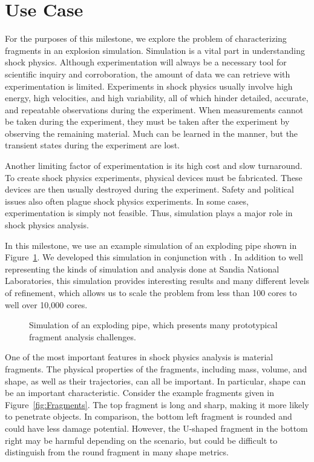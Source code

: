 \section{Use Case}
\label{sec:UseCase}


For the purposes of this milestone, we explore the problem of
characterizing fragments in an explosion simulation.  Simulation is a vital
part in understanding shock physics.  Although experimentation will always
be a necessary tool for scientific inquiry and corroboration, the amount of
data we can retrieve with experimentation is limited.  Experiments in shock
physics usually involve high energy, high velocities, and high variability,
all of which hinder detailed, accurate, and repeatable observations during
the experiment.  When measurements cannot be taken during the experiment,
they must be taken after the experiment by observing the remaining
material.  Much can be learned in the manner, but the transient states
during the experiment are lost.

Another limiting factor of experimentation is its high cost and slow
turnaround.  To create shock physics experiments, physical devices must be
fabricated.  These devices are then usually destroyed during the
experiment.  Safety and political issues also often plague shock physics
experiments.  In some cases, experimentation is simply not feasible.  Thus,
simulation plays a major role in shock physics analysis.

In this milestone, we use an example simulation of an exploding pipe shown
in Figure~\ref{fig:ExplodingPipe}.  We developed this simulation in
conjunction with .   In addition to well representing
the kinds of simulation and analysis done at Sandia National Laboratories,
this simulation provides interesting results and many different levels of
refinement, which allows us to scale the problem from less than 100 cores
to well over 10,000 cores.

\begin{figure}[htb]
  \centering
  \caption{Simulation of an exploding pipe, which presents many
    prototypical fragment analysis challenges.}
  \label{fig:ExplodingPipe}
\end{figure}

One of the most important features in shock physics analysis is material
fragments.  The physical properties of the fragments, including mass,
volume, and shape, as well as their trajectories, can all be important.  In
particular, shape can be an important characteristic.  Consider the example
fragments given in Figure~\ref{fig:Fragments}.  The top fragment is long
and sharp, making it more likely to penetrate objects.  In comparison, the
bottom left fragment is rounded and could have less damage potential.
However, the U-shaped fragment in the bottom right may be harmful depending
on the scenario, but could be difficult to distinguish from the round
fragment in many shape metrics.

